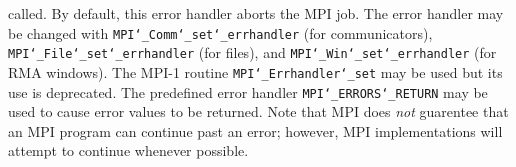 called.  By default, this error handler aborts the MPI job.  The error handler
may be changed with {\tt MPI{\tt \char`\_}Comm{\tt \char`\_}set{\tt \char`\_}errhandler} (for communicators),
{\tt MPI{\tt \char`\_}File{\tt \char`\_}set{\tt \char`\_}errhandler} (for files), and {\tt MPI{\tt \char`\_}Win{\tt \char`\_}set{\tt \char`\_}errhandler} (for
RMA windows).  The MPI-1 routine {\tt MPI{\tt \char`\_}Errhandler{\tt \char`\_}set} may be used but
its use is deprecated.  The predefined error handler
{\tt MPI{\tt \char`\_}ERRORS{\tt \char`\_}RETURN} may be used to cause error values to be returned.
Note that MPI does {\em not} guarentee that an MPI program can continue past
an error; however, MPI implementations will attempt to continue whenever
possible.
\par
{}
\par
{}
\endmanpage
